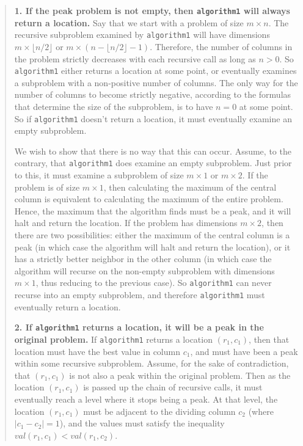\documentclass[12pt,twoside]{article}
\begin{document}
\begin{problems}
\begin{quote}
{\bf 1. If the peak problem is not empty,
then \texttt{algorithm1} will always return a location.}
Say that we start with a problem of size $m \times n$.
The recursive subproblem examined by \texttt{algorithm1}
will have dimensions
$m \times \lfloor n / 2 \rfloor$ or 
$m \times \left(n - \lfloor n / 2 \rfloor - 1 \right)$.
Therefore, the number of columns in the problem
strictly decreases with each recursive call
as long as $n > 0$.
So \texttt{algorithm1} either returns a location at some point,
or eventually examines a subproblem with a non-positive
number of columns.
The only way for the number of columns to become strictly negative,
according to the formulas that determine the size of the subproblem,
is to have $n = 0$ at some point.
So if \texttt{algorithm1} doesn't return a location,
it must eventually examine an empty subproblem.

We wish to show that there is no way that this can occur.
Assume, to the contrary,
that \texttt{algorithm1} does examine an empty subproblem.
Just prior to this,
it must examine a subproblem of size
$m \times 1$ or $m \times 2$.
If the problem is of size $m \times 1$,
then calculating the maximum of the central column
is equivalent to calculating the maximum of the entire problem.
Hence, the maximum that the algorithm finds must be a peak,
and it will halt and return the location.
If the problem has dimensions $m \times 2$,
then there are two possibilities:
either the maximum of the central column is a peak
(in which case the algorithm will halt and return the location),
or it has a strictly better neighbor in the other column
(in which case the algorithm will recurse
on the non-empty subproblem with dimensions $m \times 1$,
thus reducing to the previous case).
So \texttt{algorithm1} can never recurse into an empty subproblem,
and therefore \texttt{algorithm1} must eventually return a location.

{\bf 2. If \texttt{algorithm1} returns a location,
it will be a peak in the original problem.}
If \texttt{algorithm1} returns a location $(r_1, c_1)$,
then that location must have the best value in column $c_1$,
and must have been a peak within some recursive subproblem.
Assume, for the sake of contradiction,
that $(r_1, c_1)$ is not also a peak within the original problem.
Then as the location $(r_1, c_1)$ is passed up the chain of recursive calls,
it must eventually reach a level where it stops being a peak.
At that level, the location $(r_1, c_1)$
must be adjacent to the dividing column $c_2$ (where $|c_1 - c_2| = 1$),
and the values must satisfy the inequality
$val(r_1, c_1) < val(r_1, c_2)$.


\end{quote}
\end{problems}
\end{document}

